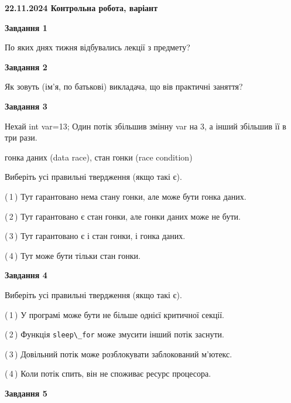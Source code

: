 \documentclass[12pt, ukrainian]{article}
\def\code#1{\Verb!#1!}
\begin{document}
\begin {large}

\textbf{22.11.2024 Контрольна робота, варіант  }\par


{

\begin{center}
\textbf{Завдання 1}
\end{center}

По яких днях тижня відбувались лекції з предмету?


\begin{center}
\textbf{Завдання 2}
\end{center}

Як зовуть (ім'я, по батькові) викладача, що вів практичні заняття?


\begin{center}
\textbf{Завдання 3}
\end{center}

Нехай int var=13; Один потік збільшив змінну var на 3, а інший збільшив її в три рази.

гонка даних (data race), стан гонки (race condition)

Виберіть усі правильні твердження (якщо такі є).\par
\vspace{2mm}
(\,1\,) Тут гарантовано нема стану гонки, але може бути гонка даних.%

(\,2\,) Тут гарантовано є стан гонки, але гонки даних може не бути.%

(\,3\,) Тут гарантовано є і стан гонки, і гонка даних.%

(\,4\,) Тут може бути тільки стан гонки.%


\begin{center}
\textbf{Завдання 4}
\end{center}

Виберіть усі правильні твердження (якщо такі є).\par
\vspace{2mm}

(\,1\,) У програмі може бути не більше однієї критичної секції.%

(\,2\,) Функція \code{sleep\_for} може змусити інший потік заснути.%

(\,3\,) Довільний потік може розблокувати заблокований м’ютекс.%

(\,4\,) Коли потік спить, він не споживає ресурс процесора.%


\begin{center}
\textbf{Завдання 5}
\end{center}

}
\end{large}
\end{document}
